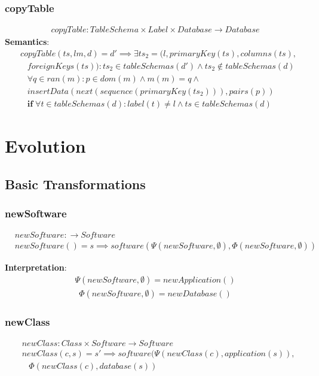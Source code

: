 \documentclass[10pt]{article}
\begin{document}
\subsubsection{copyTable}
\begin{align}
copyTable: TableSchema \times Label \times Database \rightarrow Database 
\end{align}
\noindent \textbf{Semantics}:
\begin{align}
& copyTable(ts, l m, d) = d' \implies
\exists ts_2 = (l, primaryKey(ts), columns(ts), \nonumber \\
& \;\;\; foreignKeys(ts)) : ts_2 \in tableSchemas(d') \land ts_2 \notin tableSchemas(d) \nonumber \\
& \;\;\; \forall q \in ran(m) : p \in dom(m) \land m(m) = q \land \nonumber \\  
& \;\;\; insertData(next(sequence(primaryKey(ts_2))), pairs(p))  \nonumber \\
& \;\;\; \mathbf{if} \; \forall t \in tableSchemas(d) : label(t) \neq l \land ts \in tableSchemas(d)
\end{align}


\section{Evolution}
\subsection{Basic Transformations}

\subsubsection{newSoftware}
\begin{align}
& newSoftware: \rightarrow Software \\
& newSoftware() = s \implies software(\Psi(newSoftware, \emptyset), \Phi(newSoftware, \emptyset))
\end{align}

\noindent \textbf{Interpretation}:
\begin{align}
\Psi(newSoftware, \emptyset) = newApplication()
\end{align}
\begin{align}
\Phi(newSoftware, \emptyset) = newDatabase()
\end{align}


\subsubsection{newClass}
\begin{align}
& newClass: Class \times Software \rightarrow Software \\
& newClass(c, s) = s' \implies software(\Psi(newClass(c), application(s)), \nonumber \\
& \;\;\; \Phi(newClass(c), database(s))
\end{align}
\end{document}
